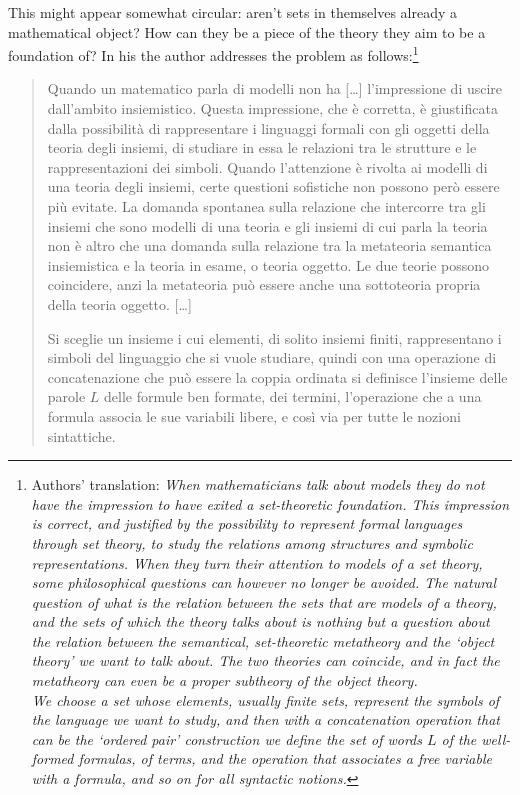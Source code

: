 This might appear somewhat circular: aren't sets in themselves already a mathematical object? How can they be a piece of the theory they aim to be a foundation of? In his \cite{lolli1977categorie} the author addresses the problem as follows:\footnote{Authors' translation: \emph{When mathematicians talk about models they do not have the impression to have exited a set-theoretic foundation. This impression is correct, and justified by the possibility to represent formal languages through set theory, to study the relations among structures and symbolic representations. When they turn their attention to models of a set theory, some philosophical questions can however no longer be avoided. The natural question of what is the relation between the sets that are models of a theory, and the sets of which the theory talks about is nothing but a question about the relation between the semantical, set-theoretic metatheory and the `object theory' we want to talk about. The two theories can coincide, and in fact the metatheory can even be a proper subtheory of the object theory.\\
\indent We choose a set whose elements, usually finite sets, represent the symbols of the language we want to study, and then with a concatenation operation that can be the `ordered pair' construction we define the set of words $L$ of the well-formed formulas, of terms, and the operation that associates a free variable with a formula, and so on for all syntactic notions.}}
\begin{quote}
    Quando un matematico parla di modelli non ha [\dots\unkern] l'impressione di uscire dall'ambito insiemistico. Questa impressione, che è corretta, è giustificata dalla possibilità di rappresentare i linguaggi formali con gli oggetti della teoria degli insiemi, di studiare in essa le relazioni tra le strutture e le rappresentazioni dei simboli. Quando l'attenzione è rivolta ai modelli di una teoria degli insiemi, certe questioni sofistiche non possono però essere più evitate. La domanda spontanea sulla relazione che intercorre tra gli insiemi che so­no modelli di una teoria e gli insiemi di cui parla la teoria non è altro che una domanda sulla relazione tra la metateoria semantica insiemi­stica e la teoria in esame, o teoria oggetto. Le due teorie possono coincidere, anzi la metateoria può essere anche una sottoteoria pro­pria della teoria oggetto. [\dots\unkern]

    Si sceglie un insieme i cui elementi, di solito insiemi finiti, rappresentano i simboli del linguaggio che si vuole studiare, quindi con una operazione di concatenazione che può essere la coppia ordinata si definisce l'insieme delle parole $L$ delle for­mule ben formate, dei termini, l'operazione che a una formula asso­cia le sue variabili libere, e così via per tutte le nozioni sintattiche.
\end{quote}
